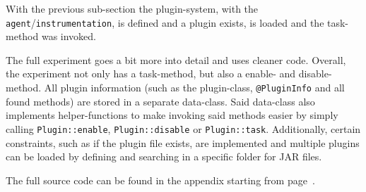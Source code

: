 With the previous sub-section the plugin-system, with the \texttt{agent}/\lstinline{instrumentation}, is defined and a plugin exists, is loaded and the task-method was invoked.

The full experiment goes a bit more into detail and uses cleaner code.
Overall, the experiment not only has a task-method, but also a enable- and disable-method.
All plugin information (such as the plugin-class, \lstinline{@PluginInfo} and all found methods) are stored in a separate data-class.
Said data-class also implements helper-functions to make invoking said methods easier by simply calling \lstinline{Plugin::enable}, \lstinline{Plugin::disable} or \lstinline{Plugin::task}.
Additionally, certain constraints, such as if the plugin file exists, are implemented and multiple plugins can be loaded by defining and searching in a specific folder for JAR files.

The full source code can be found in the appendix starting from page~\pageref{subsec:Experiment Source Code}.

